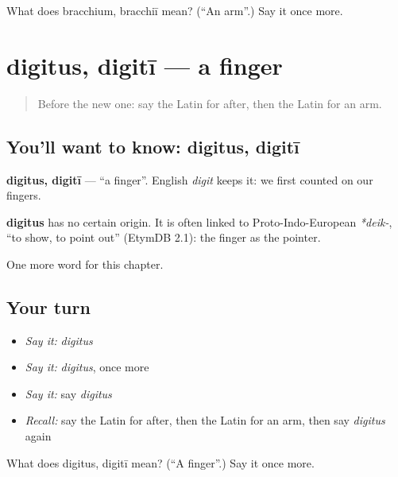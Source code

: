 \begin{tcolorbox}[breakable,colback=teal!4,colframe=teal!35!black,title={Before you move on}]
What does bracchium, bracchiī mean? (\textquotedblleft{}An arm\textquotedblright{}.) Say it once more.
\end{tcolorbox}
\section[digitus, digitī]{digitus, digitī — a finger}

\label{lesson:LA-C63-digitus}



\begin{quote}
Before the new one: say the Latin for after, then the Latin for an arm.
\end{quote}

\subsection*{You'll want to know: digitus, digitī}
\textbf{digitus, digitī} — \textquotedblleft{}a finger\textquotedblright{}. English \emph{digit} keeps it: we first counted on our fingers.

\begin{cousinweb}
\textbf{digitus} has no certain origin. It is often linked to Proto-Indo-European \emph{*deik-}, \textquotedblleft{}to show, to point out\textquotedblright{} (EtymDB 2.1): the finger as the pointer.
\end{cousinweb}

\begin{grammarlens}[title={What you've built}]
One more word for this chapter.
\end{grammarlens}

\subsection*{Your turn}
\begin{itemize}
\raggedright
  \item \emph{Say it:} \emph{digitus}
  \item \emph{Say it:} \emph{digitus}, once more
  \item \emph{Say it:} say \emph{digitus}
  \item \emph{Recall:} say the Latin for after, then the Latin for an arm, then say \emph{digitus} again
\end{itemize}

\begin{tcolorbox}[breakable,colback=teal!4,colframe=teal!35!black,title={Before you move on}]
What does digitus, digitī mean? (\textquotedblleft{}A finger\textquotedblright{}.) Say it once more.
\end{tcolorbox}
